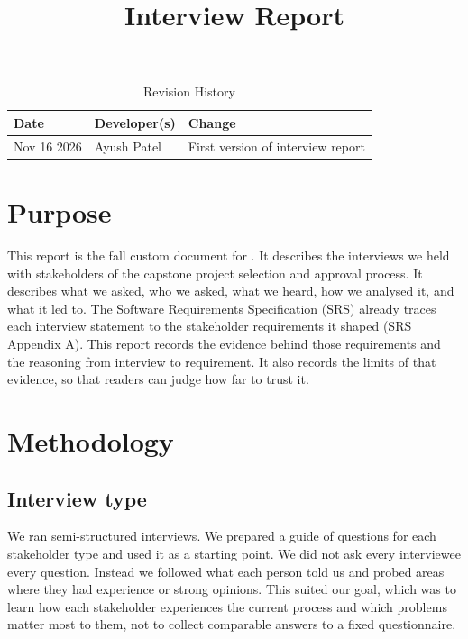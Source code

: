 \documentclass{article}
\title{Interview Report\\\projname}
\author{\authname}
\date{}
\begin{document}
    \maketitle

    \begin{table}[hp]
        \caption{Revision History} \label{TblRevisionHistory}
        \begin{tabularx}{\textwidth}{llX}
\toprule
\textbf{Date} & \textbf{Developer(s)} & \textbf{Change}\\
\midrule
Nov 16 2026 & Ayush Patel & First version of interview report \\
\bottomrule
        \end{tabularx}
    \end{table}

    \newpage
    \tableofcontents
    \newpage

    \section{Purpose}

    This report is the fall custom document for \projname{}. It describes the
    interviews we held with stakeholders of the capstone project selection and
    approval process. It describes what we asked, who we asked, what we heard, how we analysed
    it, and what it led to. The Software Requirements Specification (SRS) already
    traces each interview statement to the stakeholder requirements it shaped
    (SRS Appendix A). This report records the evidence behind those requirements
    and the reasoning from interview to requirement. It also records the
    limits of that evidence, so that readers can judge how far to trust it.

    \section{Methodology}

    \subsection{Interview type}

    We ran semi-structured interviews. We prepared a guide of questions for each
    stakeholder type and used it as a starting point. We did not ask every
    interviewee every question. Instead we followed what each person told us and
    probed areas where they had experience or strong opinions. This suited our
    goal, which was to learn how each stakeholder experiences the current process
    and which problems matter most to them, not to collect comparable answers to a
    fixed questionnaire.
\end{document}
